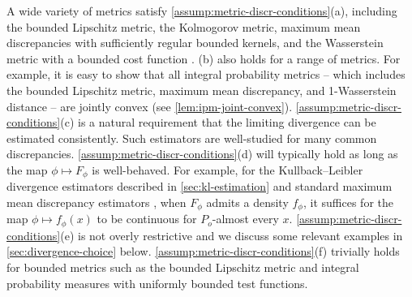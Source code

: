 \begin{remark} A wide variety of metrics satisfy \cref{assump:metric-discr-conditions}(a), including the bounded Lipschitz metric,
the Kolmogorov metric, maximum mean discrepancies with sufficiently regular bounded kernels, and the Wasserstein metric with a bounded cost function \citep{Vaart:1996,Sriperumbudur:2010,SimonGabriel:2018,Villani:2009}.
(b) also holds for a range of metrics.
For example, it is easy to show that all integral probability metrics -- which includes the bounded Lipschitz
metric, maximum mean discrepancy, and 1-Wasserstein distance -- are jointly convex (see \cref{lem:ipm-joint-convex}).
\cref{assump:metric-discr-conditions}(c) is a natural requirement that the limiting divergence can be estimated consistently.
Such estimators are well-studied for many common discrepancies.
\cref{assump:metric-discr-conditions}(d) will typically hold as long as the map $\phi \mapsto F_{\phi}$ is
well-behaved.
For example, for the Kullback--Leibler divergence estimators described in \cref{sec:kl-estimation}
and standard maximum mean discrepancy estimators \citep{Gretton:2012,Krause:2023},
when $F_{\phi}$ admits a density $f_{\phi}$, it suffices for the map $\phi \mapsto f_{\phi}(x)$
to be continuous for $P_{o}$-almost every $x$.
\cref{assump:metric-discr-conditions}(e) is not overly restrictive and we discuss some relevant examples in \cref{sec:divergence-choice} below.
\cref{assump:metric-discr-conditions}(f) trivially holds for bounded metrics such as the bounded Lipschitz metric and integral probability measures with uniformly bounded test functions.
\end{remark}

